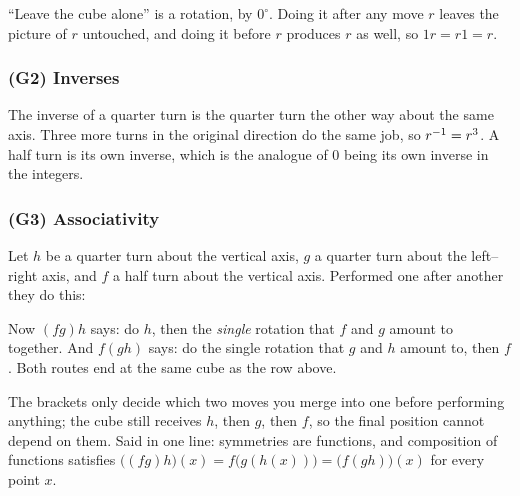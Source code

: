 ``Leave the cube alone'' is a rotation, by $0^\circ$. Doing it after any move $r$ leaves the
picture of $r$ untouched, and doing it before $r$ produces $r$ as well, so $1r=r1=r$.


\subsubsection*{(G2) Inverses}

The inverse of a quarter turn is the quarter turn the other way about the same axis. Three more
turns in the original direction do the same job, so $r^{-1}=r^3$. A half turn is its own inverse,
which is the analogue of $0$ being its own inverse in the integers.


\subsubsection*{(G3) Associativity}

Let $h$ be a quarter turn about the vertical axis, $g$ a quarter turn about the left--right axis,
and $f$ a half turn about the vertical axis. Performed one after another they do this:


Now $(fg)h$ says: do $h$, then the \emph{single} rotation that $f$ and $g$ amount to together.
And $f(gh)$ says: do the single rotation that $g$ and $h$ amount to, then $f$. Both routes end at
the same cube as the row above.



The brackets only decide which two moves you merge into one before performing anything; the cube
still receives $h$, then $g$, then $f$, so the final position cannot depend on them. Said in one
line: symmetries are functions, and composition of functions satisfies
$\big((fg)h\big)(x)=f\big(g(h(x))\big)=\big(f(gh)\big)(x)$ for every point $x$.

